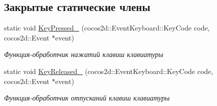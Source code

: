 \subsection*{Закрытые статические члены}
\begin{DoxyCompactItemize}
\item 
\mbox{\label{classrtm_1_1_world_scene_aefb82a92ad3131fc4a6f722ffc492871}} 
static void \hyperlink{classrtm_1_1_world_scene_aefb82a92ad3131fc4a6f722ffc492871}{Key\+Pressed\+\_\+} (cocos2d\+::\+Event\+Keyboard\+::\+Key\+Code code, cocos2d\+::\+Event $\ast$event)
\begin{DoxyCompactList}\small\item\em Функция-\/обработчик нажатий клавиш клавиатуры \end{DoxyCompactList}\item 
\mbox{\label{classrtm_1_1_world_scene_af0c7e2ce255204096ba1547d06c126b3}} 
static void \hyperlink{classrtm_1_1_world_scene_af0c7e2ce255204096ba1547d06c126b3}{Key\+Released\+\_\+} (cocos2d\+::\+Event\+Keyboard\+::\+Key\+Code code, cocos2d\+::\+Event $\ast$event)
\begin{DoxyCompactList}\small\item\em Функция-\/обработчик отпусканий клавиш клавиатуры \end{DoxyCompactList}\end{DoxyCompactItemize}
